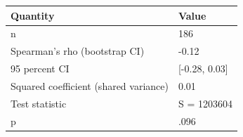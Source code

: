 \begin{table}[ht]
\centering
\begingroup\footnotesize
\begin{tabular}{ll}
  \toprule
Quantity & Value \\ 
  \midrule
n & 186 \\ 
  Spearman's rho (bootstrap CI) & -0.12 \\ 
  95 percent CI & [-0.28, 0.03] \\ 
  Squared coefficient (shared variance) & 0.01 \\ 
  Test statistic & S = 1203604 \\ 
  p & .096 \\ 
   \bottomrule
\end{tabular}
\endgroup
\end{table}

